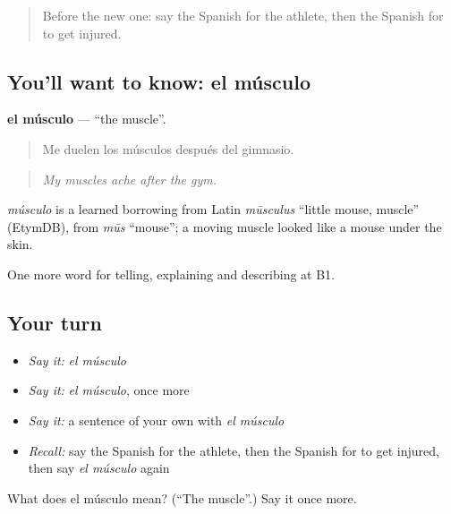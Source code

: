 \label{lesson:ES-C755-musculo}



\begin{quote}
Before the new one: say the Spanish for the athlete, then the Spanish for to get injured.
\end{quote}

\subsection*{You'll want to know: el músculo}
\textbf{el músculo} — \textquotedblleft{}the muscle\textquotedblright{}.

\begin{quote}
Me duelen los músculos después del gimnasio.
\end{quote}

\begin{quote}
\emph{My muscles ache after the gym.}
\end{quote}

\begin{cousinweb}
\emph{músculo} is a learned borrowing from Latin \emph{mūsculus} \textquotedblleft{}little mouse, muscle\textquotedblright{} (EtymDB), from \emph{mūs} \textquotedblleft{}mouse\textquotedblright{}; a moving muscle looked like a mouse under the skin.
\end{cousinweb}

\begin{grammarlens}[title={What you've built}]
One more word for telling, explaining and describing at B1.
\end{grammarlens}

\subsection*{Your turn}
\begin{itemize}
\raggedright
  \item \emph{Say it:} \emph{el músculo}
  \item \emph{Say it:} \emph{el músculo}, once more
  \item \emph{Say it:} a sentence of your own with \emph{el músculo}
  \item \emph{Recall:} say the Spanish for the athlete, then the Spanish for to get injured, then say \emph{el músculo} again
\end{itemize}

\begin{tcolorbox}[breakable,colback=teal!4,colframe=teal!35!black,title={Before you move on}]
What does el músculo mean? (\textquotedblleft{}The muscle\textquotedblright{}.) Say it once more.
\end{tcolorbox}
